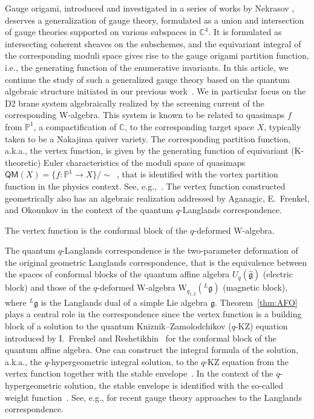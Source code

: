 Gauge origami, introduced and investigated in a series of works by Nekrasov \cite{Nekrasov:2015wsu,Nekrasov:2016qym,Nekrasov:2016ydq,Nekrasov:2017rqy,Nekrasov:2017gzb}, deserves a generalization of gauge theory, formulated as a union and intersection of gauge theories supported on various subspaces in $\mathbb{C}^4$.
It is formulated as intersecting coherent sheaves on the subschemes, and the equivariant integral of the corresponding moduli space gives rise to the gauge origami partition function, i.e., the generating function of the enumerative invariants.
In this article, we continue the study of such a generalized gauge theory based on the quantum algebraic structure initiated in our previous work~\cite{Kimura:2023bxy}.
We in particular focus on the D2 brane system algebraically realized by the screening current of the corresponding W-algebra.
This system is known to be related to quasimaps $f$ from $\mathbb{P}^1$, a compactification of $\mathbb{C}$, to the corresponding target space $X$, typically taken to be a Nakajima quiver variety.
The corresponding partition function, a.k.a., the vertex function, is given by the generating function of equivariant (K-theoretic) Euler characteristics of the moduli space of quasimaps $\mathsf{QM}(X) = \{f : \mathbb{P}^1 \to X \}/\sim$~\cite{Okounkov:2015spn}, that is identified with the vortex partition function in the physics context.
See, e.g.,~\cite{Dedushenko:2023qjq,Crew:2023tky}.
The vertex function constructed geometrically also has an algebraic realization addressed by Aganagic, E.~Frenkel, and Okounkov in the context of the quantum $q$-Langlands correspondence.
\begin{theorem}\label{thm:AFO}
    The vertex function is the conformal block of the $q$-deformed W-algebra.
\end{theorem}
The quantum $q$-Langlands correspondence is the two-parameter deformation of the original geometric Langlands correspondence, that is the equivalence between the spaces of conformal blocks of the quantum affine algebra $U_q(\widehat{\mathfrak{g}})$ (electric block) and those of the $q$-deformed W-algebra W$_{q_{1,2}}({}^L\mathfrak{g})$ (magnetic block), where $^L\mathfrak{g}$ is the Langlands dual of a simple Lie algebra $\mathfrak{g}$.
Theorem~\ref{thm:AFO} plays a central role in the correspondence since the vertex function is a building block of a solution to the quantum Kniznik--Zamolodchikov ($q$-KZ) equation introduced by I.~Frenkel and Reshetikhin~\cite{Frenkel:1991gx} for the conformal block of the quantum affine algebra.
One can construct the integral formula of the solution, a.k.a., the $q$-hypergeometric integral solution, to the $q$-KZ equation from the vertex function together with the stable envelope~\cite{Maulik:2012wi}. 
In the context of the $q$-hypergeometric solution, the stable envelope is identified with the so-called weight function~\cite{Gorbounov:2012uu,Rimanyi:2014JPG,Felder:2017SIGMA,Konno:2017mos}.
See, e.g., \cite{Tamagni:2023wan,Haouzi:2023doo,Jeong:2024hwf} for recent gauge theory approaches to the Langlands correspondence.

